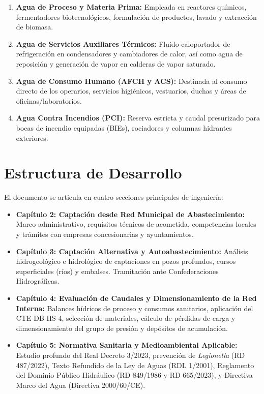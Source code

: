 \documentclass{report}
\begin{document}
\begin{enumerate}

    \item \textbf{Agua de Proceso y Materia Prima:} Empleada en reactores químicos, fermentadores biotecnológicos, formulación de productos, lavado y extracción de biomasa.

    \item \textbf{Agua de Servicios Auxiliares Térmicos:} Fluido caloportador de refrigeración en condensadores y cambiadores de calor, así como agua de reposición y generación de vapor en calderas de vapor saturado.

    \item \textbf{Agua de Consumo Humano (AFCH y ACS):} Destinada al consumo directo de los operarios, servicios higiénicos, vestuarios, duchas y áreas de oficinas/laboratorios.

    \item \textbf{Agua Contra Incendios (PCI):} Reserva estricta y caudal presurizado para bocas de incendio equipadas (BIEs), rociadores y columnas hidrantes exteriores.

\end{enumerate}



\section{Estructura de Desarrollo}

El documento se articula en cuatro secciones principales de ingeniería:

\begin{itemize}

    \item \textbf{Capítulo 2: Captación desde Red Municipal de Abastecimiento:} Marco administrativo, requisitos técnicos de acometida, competencias locales y trámites con empresas concesionarias y ayuntamientos.

    \item \textbf{Capítulo 3: Captación Alternativa y Autoabastecimiento:} Análisis hidrogeológico e hidrológico de captaciones en pozos profundos, cursos superficiales (ríos) y embalses. Tramitación ante Confederaciones Hidrográficas.

    \item \textbf{Capítulo 4: Evaluación de Caudales y Dimensionamiento de la Red Interna:} Balances hídricos de proceso y consumos sanitarios, aplicación del CTE DB-HS 4, selección de materiales, cálculo de pérdidas de carga y dimensionamiento del grupo de presión y depósitos de acumulación.

    \item \textbf{Capítulo 5: Normativa Sanitaria y Medioambiental Aplicable:} Estudio profundo del Real Decreto 3/2023, prevención de \textit{Legionella} (RD 487/2022), Texto Refundido de la Ley de Aguas (RDL 1/2001), Reglamento del Dominio Público Hidráulico (RD 849/1986 y RD 665/2023), y Directiva Marco del Agua (Directiva 2000/60/CE).

\end{itemize}
\end{document}
